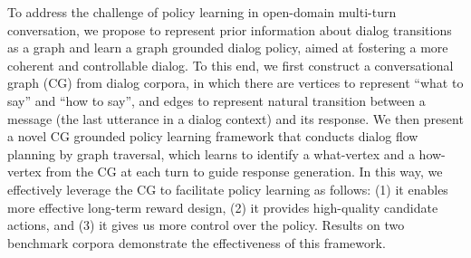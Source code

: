 To address the challenge of policy learning in open-domain multi-turn conversation, we propose to represent prior information about dialog transitions as a graph and learn a graph grounded dialog policy, aimed at fostering a more coherent and controllable dialog. To this end, we first construct a conversational graph (CG) from dialog corpora, in which there are vertices to represent ``what to say'' and ``how to say'', and edges to represent natural transition between a message (the last utterance in a dialog context) and its response. We then present a novel CG grounded policy learning framework that conducts dialog flow planning by graph traversal, which learns to identify a what-vertex and a how-vertex from the CG at each turn to guide response generation. In this way, we effectively leverage the CG to facilitate policy learning as follows: (1) it enables more effective long-term reward design, (2) it provides high-quality candidate actions, and (3) it gives us more control over the policy. Results on two benchmark corpora demonstrate the effectiveness of this framework.
